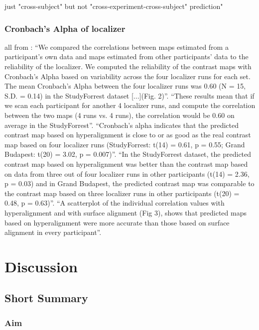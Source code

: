 just "cross-subject" but not "cross-experiment-cross-subject" prediction"


\subsubsection{Cronbach's Alpha of localizer}


all from \citep{jiahui2020predicting}: ``We compared the correlations between
maps estimated from a participant's own data and maps estimated from other
participants' data to the reliability of the localizer. We computed the
reliability of the contrast maps with Cronbach's Alpha based on variability
across the four localizer runs for each set. The mean Cronbach's Alpha between
the four localizer runs was 0.60 (N = 15, S.D. = 0.14) in the StudyForrest
dataset [...](Fig. 2)''.
%
``These results mean that if we scan each participant for another 4 localizer
runs, and compute the correlation between the two maps (4 runs vs. 4 runs), the
correlation would be 0.60 on average in the StudyForrest''.
%
``Cronbach's alpha indicates that the predicted contrast map based on
hyperalignment is close to or as good as the real contrast map based on four
localizer runs (StudyForrest: t(14) = 0.61, p = 0.55; Grand Budapest: t(20) =
3.02, p = 0.007)''.
%
``In the StudyForrest dataset, the predicted contrast map based on
hyperalignment was better than the contrast map based on data from three out of
four localizer runs in other participants (t(14) = 2.36, p = 0.03) and in Grand
Budapest, the predicted contrast map was comparable to the contrast map based on
three localizer runs in other participants (t(20) = 0.48, p = 0.63)''.
%
``A scatterplot of the individual correlation values with hyperalignment and
with surface alignment (Fig 3), shows that predicted maps based on
hyperalignment were more accurate than those based on surface alignment in every
participant''.


\section{Discussion}


\subsection{Short Summary}

\subsubsection{Aim}

